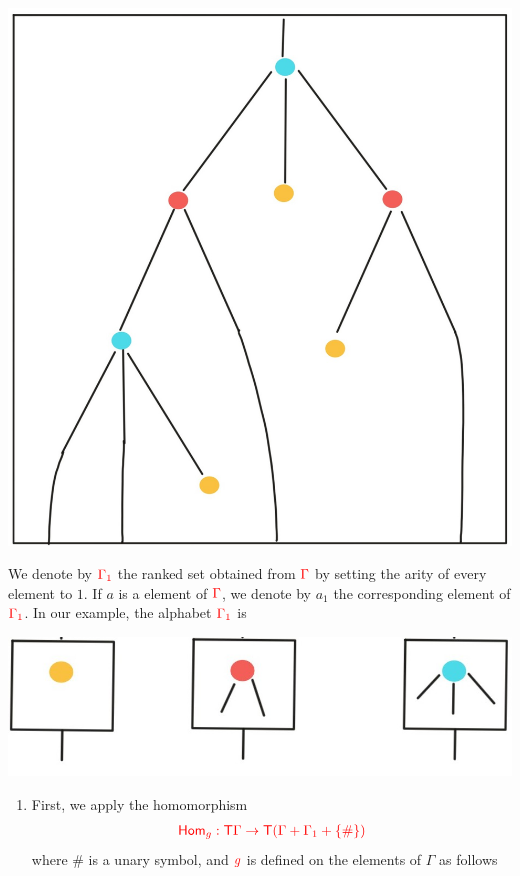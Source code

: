 \begin{example}
\begin{center}
		 \includegraphics[scale=.15]{MyPic1.jpg}
		\end{center}
We denote by ${\color{red}{\Gamma_1}}$ the ranked set obtained from ${\color{red}{\Gamma}}$ by setting the arity of every element to $1$. If $a$ is a element of ${\color{red}{\Gamma}}$, we denote by $a_1$ the corresponding element of ${\color{red}{\Gamma_1}}$. In our example, the alphabet ${\color{red}{\Gamma_1}}$ is
\begin{center}
		\includegraphics[scale=.15]{MyPic2.jpg}
		\end{center}
\begin{enumerate}
\item  First, we apply the homomorphism 
\begin{align*}
{\color{red}{\mathsf{Hom}_g:{\color{red}{\mathsf T}}\Gamma\to {\color{red}{\mathsf T}}(\Gamma+\Gamma_1+\{\#\})}}
\end{align*}
where $\#$ is a unary symbol, and ${\color{red}{g}}$ is defined on the elements of $\Gamma$ as follows

\end{enumerate}
\end{example}
